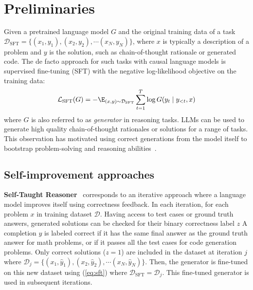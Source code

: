 



\section{Preliminaries}


Given a pretrained language model $G$ and the original training data of a task $\mathcal{D}_{\text{SFT}} = \{(x_1, y_1), (x_2, y_2), \cdots (x_N, y_N)\}$, where $x$ is typically a description of a problem and $y$ is the solution, such as chain-of-thought rationale or generated code. 
The de facto approach for such tasks 
 with causal language models is supervised fine-tuning (SFT) with the negative log-likelihood objective on the training data:
\begin{equation}
\label{eq:sft}\mathcal{L}_{\text{SFT}}(G) = -\E_{(x,y)\sim \mathcal{D}_{\text{SFT}}} \sum\limits_{t=1}^{T} \log G (y_t \mid y_{<t}, x)
\end{equation}
where $G$ is also referred to as \textit{generator} in reasoning tasks. %
LLMs can be used to generate high quality chain-of-thought rationales or solutions for a range of tasks. 
This observation has motivated using correct generations from the model itself to bootstrap problem-solving and reasoning abilities~\citep{DBLP:conf/nips/ZelikmanWMG22, singh2023human, yuan2023scaling}.



\subsection{Self-improvement approaches}
\label{sec:si_approach}

\textbf{Self-Taught Reasoner}~\citep[STaR;][]{DBLP:conf/nips/ZelikmanWMG22} corresponds to an iterative approach where a language model improves itself using correctness feedback.
In each iteration, for each problem $x$ in training dataset $\mathcal{D}$.
Having access to test cases or ground truth answers, generated solutions can be checked for their binary correctness label $z$ 
A completion $\hat{y}$ is labeled correct if it has the same final answer as the ground truth answer for math problems, or if it passes all the test cases for code generation problems.
Only correct solutions ($z = 1$) are included in the dataset at iteration $j$ where $\mathcal{D}_j = \{(x_1, \hat{y}_1), (x_2, \hat{y}_2), \cdots (x_N, \hat{y}_N)\}$.
Then, the generator is fine-tuned on this new dataset using (\autoref{eq:sft}) where $\mathcal{D}_{\text{SFT}} = \mathcal{D}_j$. This fine-tuned generator is used in subsequent iterations. 



